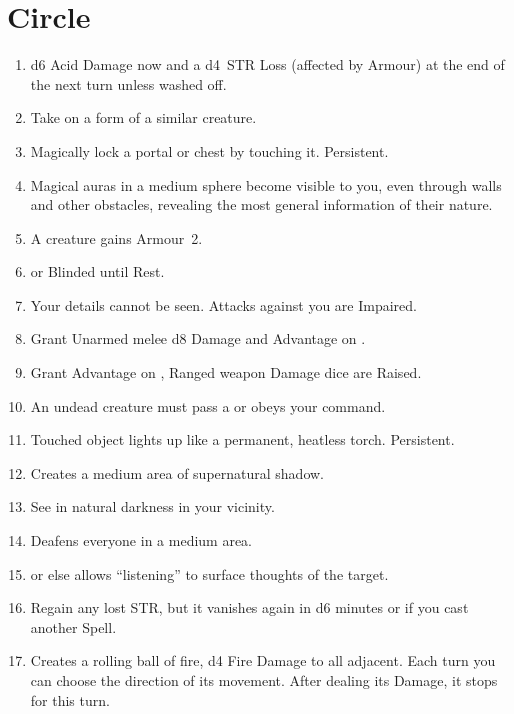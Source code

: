 \documentclass[itdr/core]{subfiles}
\begin{document}

\vfill
\break

\section{ Circle}
\def \spellcircle {2}
\begin{enumerate}
	\item {} d6 Acid Damage now and a d4~STR Loss (affected by Armour) at the end of the next turn unless washed off.
	\item {} Take on a form of a similar creature.
	\item {} Magically lock a portal or chest by touching it. Persistent.
	\item {} Magical auras in a medium sphere become visible to you, even through walls and other obstacles, revealing the most general information of their nature.
	\item {} A creature gains Armour~2.
	\item {}  or Blinded until Rest.
	\item {} Your details cannot be seen. Attacks against you are Impaired.
	\item {} Grant Unarmed melee d8 Damage and Advantage on .
	\item {} Grant Advantage on , Ranged weapon Damage dice are Raised.
	\item {} An undead creature must pass a  or obeys your command.
	\item {} Touched object lights up like a permanent, heatless torch. Persistent.
	\item {} Creates a medium area of supernatural shadow.
	\item {} See in natural darkness in your vicinity.
	\item {} Deafens everyone in a medium area.
	\item {}  or else allows \mbox{``listening''} to surface thoughts of the target.
	\item {} Regain any lost STR, but it vanishes again in d6 minutes or if you cast another Spell.
	\item {} Creates a rolling ball of fire, d4 Fire Damage to all adjacent. Each turn you can choose the direction of its movement. After dealing its Damage, it stops for this turn.

\end{enumerate}
\end{document}

